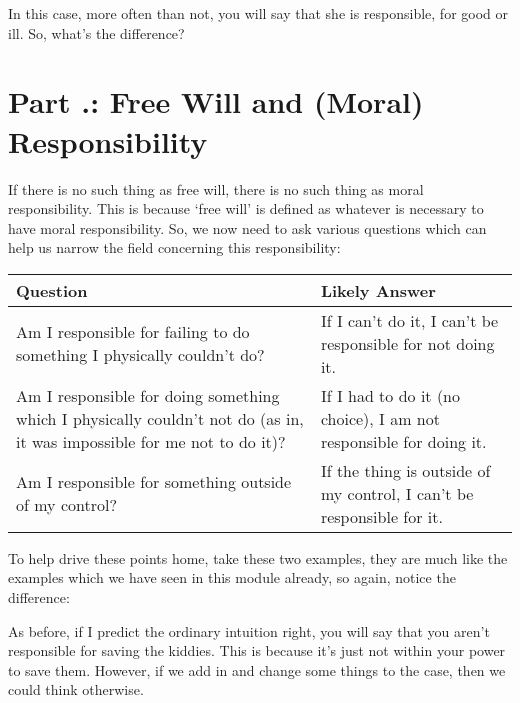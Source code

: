 
In this case, more often than not, you will say that she is responsible, for good or ill. So, what's the difference?  
\section{Part \thechapcount.\theseccount:   Free Will and (Moral) Responsibility}

If there is no such thing as free will, there is no such thing as moral responsibility. This is because ‘free will’ is defined as whatever is necessary to have moral responsibility. So, we now need to ask various questions which can help us narrow the field concerning this responsibility:
\noindent
\begin{tabular}{p{2.75in}|p{2.75in}|}
Question&Likely Answer\\\hline
Am I responsible for failing to do something I physically couldn’t do?&If I can't do it, I can't be responsible for not doing it.\\
\hline
Am I responsible for doing something which I physically couldn’t not do (as in, it was impossible for me not to do it)?&If I had to do it (no choice), I am not responsible for doing it.\\
\hline
Am I responsible for something outside of my control?&If the thing is outside of my control, I can’t be responsible for it.
\end{tabular}

To help drive these points home, take these two examples, they are much like the examples which we have seen in this module already, so again, notice the difference:


As before, if I predict the ordinary intuition right, you will say that you aren't responsible for saving the kiddies. This is because it's just not within your power to save them. However, if we add in and change some things to the case, then we could think otherwise.

